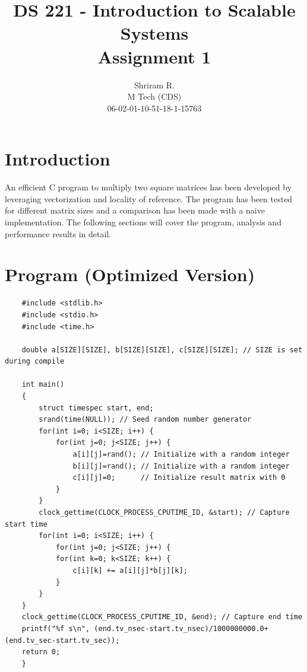 \documentclass[11pt,a4paper,oneside]{article}
\begin{document}
	\title{DS 221 - Introduction to Scalable Systems \\ Assignment 1}
	\author{Shriram R. \\ M Tech (CDS) \\ 06-02-01-10-51-18-1-15763}
	\maketitle
	
	\section{Introduction}
	An efficient C program to multiply two square matrices has been developed by leveraging vectorization and locality of reference. The program has been tested for different matrix sizes and a comparison has been made with a naive implementation. The following sections will cover the program, analysis and performance results in detail.
	
	\section{Program (Optimized Version)}
	\begin{verbatim}
	#include <stdlib.h>
	#include <stdio.h>
	#include <time.h>
	
	double a[SIZE][SIZE], b[SIZE][SIZE], c[SIZE][SIZE]; // SIZE is set during compile
	
	int main()
	{
	    struct timespec start, end;
	    srand(time(NULL)); // Seed random number generator	    
	    for(int i=0; i<SIZE; i++) {
	        for(int j=0; j<SIZE; j++) {
	            a[i][j]=rand(); // Initialize with a random integer
	            b[i][j]=rand(); // Initialize with a random integer
	            c[i][j]=0;      // Initialize result matrix with 0
	        }
	    }	
	    clock_gettime(CLOCK_PROCESS_CPUTIME_ID, &start); // Capture start time	    
	    for(int i=0; i<SIZE; i++) {
	        for(int j=0; j<SIZE; j++) {
            for(int k=0; k<SIZE; k++) {
                c[i][k] += a[i][j]*b[j][k];
            }
        }
    }        
    clock_gettime(CLOCK_PROCESS_CPUTIME_ID, &end); // Capture end time        
    printf("%f s\n", (end.tv_nsec-start.tv_nsec)/1000000000.0+(end.tv_sec-start.tv_sec));
    return 0;
	}
	
	
	
	\end{verbatim}
	
\end{document}
